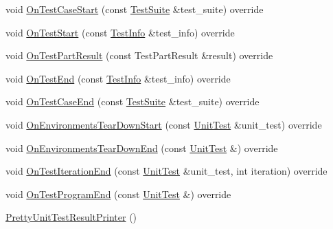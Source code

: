 \begin{DoxyCompactItemize}
\item 
void \mbox{\hyperlink{classtesting_1_1internal_1_1_pretty_unit_test_result_printer_a168314907137d4a9320a685c33b80e67}{On\+Test\+Case\+Start}} (const \mbox{\hyperlink{classtesting_1_1_test_suite}{Test\+Suite}} \&test\+\_\+suite) override
\item 
void \mbox{\hyperlink{classtesting_1_1internal_1_1_pretty_unit_test_result_printer_a079ac0eb5f8cdd2511cfd33ef931338b}{On\+Test\+Start}} (const \mbox{\hyperlink{classtesting_1_1_test_info}{Test\+Info}} \&test\+\_\+info) override
\item 
void \mbox{\hyperlink{classtesting_1_1internal_1_1_pretty_unit_test_result_printer_a89caba1698d6999082e938f814dd8ece}{On\+Test\+Part\+Result}} (const Test\+Part\+Result \&result) override
\item 
void \mbox{\hyperlink{classtesting_1_1internal_1_1_pretty_unit_test_result_printer_a085f90bb9f3128d8d8864c19e1e188ef}{On\+Test\+End}} (const \mbox{\hyperlink{classtesting_1_1_test_info}{Test\+Info}} \&test\+\_\+info) override
\item 
void \mbox{\hyperlink{classtesting_1_1internal_1_1_pretty_unit_test_result_printer_a4d5d603ee674a7929c6361c0fbcb695d}{On\+Test\+Case\+End}} (const \mbox{\hyperlink{classtesting_1_1_test_suite}{Test\+Suite}} \&test\+\_\+suite) override
\item 
void \mbox{\hyperlink{classtesting_1_1internal_1_1_pretty_unit_test_result_printer_a97efe483cbb1c55d32bdc7a997a99f13}{On\+Environments\+Tear\+Down\+Start}} (const \mbox{\hyperlink{classtesting_1_1_unit_test}{Unit\+Test}} \&unit\+\_\+test) override
\item 
void \mbox{\hyperlink{classtesting_1_1internal_1_1_pretty_unit_test_result_printer_a6700b0664749940a93917c5dcc3b90ed}{On\+Environments\+Tear\+Down\+End}} (const \mbox{\hyperlink{classtesting_1_1_unit_test}{Unit\+Test}} \&) override
\item 
void \mbox{\hyperlink{classtesting_1_1internal_1_1_pretty_unit_test_result_printer_a447fc02d3e3af17cef6f0727bab7414a}{On\+Test\+Iteration\+End}} (const \mbox{\hyperlink{classtesting_1_1_unit_test}{Unit\+Test}} \&unit\+\_\+test, int iteration) override
\item 
void \mbox{\hyperlink{classtesting_1_1internal_1_1_pretty_unit_test_result_printer_a26c7e1a921099dd50fbadd2b0ce3692a}{On\+Test\+Program\+End}} (const \mbox{\hyperlink{classtesting_1_1_unit_test}{Unit\+Test}} \&) override
\item 
\mbox{\hyperlink{classtesting_1_1internal_1_1_pretty_unit_test_result_printer_a9219a4263ef0057c98a2a2a41f35ee15}{Pretty\+Unit\+Test\+Result\+Printer}} ()

\end{DoxyCompactItemize}
